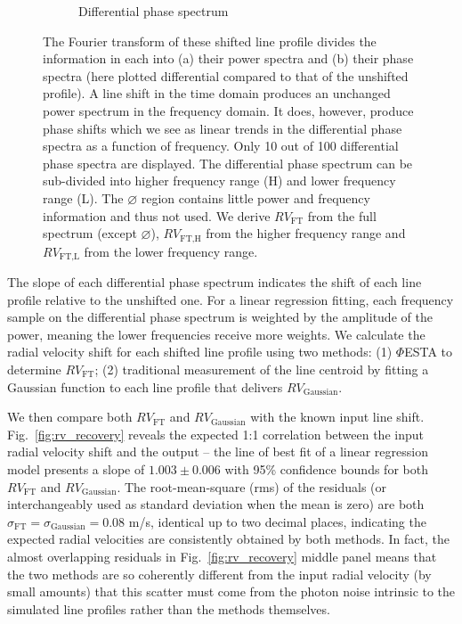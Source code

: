 \begin{figure}[tbp]
\begin{subfigure}[b]{0.49\textwidth}
        \caption{Differential phase spectrum}
        \label{fig:dps}
    \end{subfigure}	
    \caption[Fourier transform of 100 shifted line profiles]
    {The Fourier transform of these shifted line profile divides the information in each into (a) their power spectra and (b) their phase spectra (here plotted differential compared to that of the unshifted profile). A line shift in the time domain produces an unchanged power spectrum in the frequency domain. It does, however, produce phase shifts which we see as linear trends in the differential phase spectra as a function of frequency. Only 10 out of 100 differential phase spectra are displayed. The differential phase spectrum can be sub-divided into higher frequency range (H) and lower frequency range (L). The $\varnothing$ region contains little power and frequency information and thus not used. We derive $RV_\text{FT}$ from the full spectrum (except $\varnothing$), $RV_\text{FT,H}$ from the higher frequency range and $RV_\text{FT,L}$ from the lower frequency range.}
\label{fig:FT_process}
\end{figure}    

The slope of each differential phase spectrum indicates the shift of each line profile relative to the unshifted one. For a linear regression fitting, each frequency sample on the differential phase spectrum is weighted by the amplitude of the power, meaning the lower frequencies receive more weights. We calculate the radial velocity shift for each shifted line profile using two methods: (1) $\mathit{\Phi}$ESTA to determine $RV_\text{FT}$; (2) traditional measurement of the line centroid by fitting a Gaussian function to each line profile that delivers $RV_\text{Gaussian}$. 

We then compare both $RV_\text{FT}$ and $RV_\text{Gaussian}$ with the known input line shift. Fig.~\ref{fig:rv_recovery} reveals the expected 1:1 correlation between the input radial velocity shift and the output -- the line of best fit of a linear regression model presents a slope of $1.003\pm0.006$ with 95\% confidence bounds for both $RV_\text{FT}$ and $RV_\text{Gaussian}$. The root-mean-square (rms) of the residuals (or interchangeably used as standard deviation when the mean is zero) are both $\sigma_\text{FT} = \sigma_\text{Gaussian} = 0.08$ m/s, identical up to two decimal places, indicating the expected radial velocities are consistently obtained by both methods. In fact, the almost overlapping residuals in Fig.~\ref{fig:rv_recovery} middle panel means that the two methods are so coherently different from the input radial velocity (by small amounts) that this scatter must come from the photon noise intrinsic to the simulated line profiles rather than the methods themselves. 

